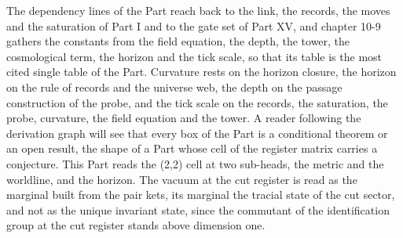 The dependency lines of the Part reach back to the link, the records, the moves and the saturation of Part I and to the gate set of Part XV, and chapter 10-9 gathers the constants from the field equation, the depth, the tower, the cosmological term, the horizon and the tick scale, so that its table is the most cited single table of the Part. Curvature rests on the horizon closure, the horizon on the rule of records and the universe web, the depth on the passage construction of the probe, and the tick scale on the records, the saturation, the probe, curvature, the field equation and the tower. A reader following the derivation graph will see that every box of the Part is a conditional theorem or an open result, the shape of a Part whose cell of the register matrix carries a conjecture.
This Part reads the (2,2) cell at two sub-heads, the metric and the worldline, and the horizon. The vacuum at the cut register is read as the marginal built from the pair kets, its marginal the tracial state of the cut sector, and not as the unique invariant state, since the commutant of the identification group at the cut register stands above dimension one.
